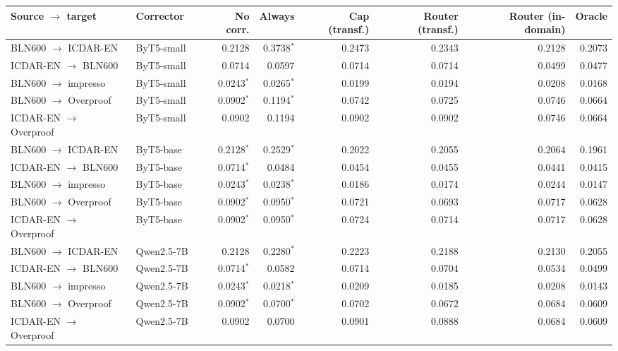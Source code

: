 \begin{tabular}{lllrrrrrr}
\toprule
Source $\rightarrow$ target & Corrector & & No corr. & Always & Cap (transf.) & Router (transf.) & Router (in-domain) & Oracle \\
\midrule
BLN600 $\rightarrow$ ICDAR-EN & ByT5-small & & 0.2128 & 0.3738$^{*}$ & 0.2473 & 0.2343 & 0.2128 & 0.2073 \\
ICDAR-EN $\rightarrow$ BLN600 & ByT5-small & & 0.0714 & 0.0597 & 0.0714 & 0.0714 & 0.0499 & 0.0477 \\
BLN600 $\rightarrow$ impresso & ByT5-small & & 0.0243$^{*}$ & 0.0265$^{*}$ & 0.0199 & 0.0194 & 0.0208 & 0.0168 \\
BLN600 $\rightarrow$ Overproof & ByT5-small & & 0.0902$^{*}$ & 0.1194$^{*}$ & 0.0742 & 0.0725 & 0.0746 & 0.0664 \\
ICDAR-EN $\rightarrow$ Overproof & ByT5-small & & 0.0902 & 0.1194 & 0.0902 & 0.0902 & 0.0746 & 0.0664 \\
BLN600 $\rightarrow$ ICDAR-EN & ByT5-base & & 0.2128$^{*}$ & 0.2529$^{*}$ & 0.2022 & 0.2055 & 0.2064 & 0.1961 \\
ICDAR-EN $\rightarrow$ BLN600 & ByT5-base & & 0.0714$^{*}$ & 0.0484 & 0.0454 & 0.0455 & 0.0441 & 0.0415 \\
BLN600 $\rightarrow$ impresso & ByT5-base & & 0.0243$^{*}$ & 0.0238$^{*}$ & 0.0186 & 0.0174 & 0.0244 & 0.0147 \\
BLN600 $\rightarrow$ Overproof & ByT5-base & & 0.0902$^{*}$ & 0.0950$^{*}$ & 0.0721 & 0.0693 & 0.0717 & 0.0628 \\
ICDAR-EN $\rightarrow$ Overproof & ByT5-base & & 0.0902$^{*}$ & 0.0950$^{*}$ & 0.0724 & 0.0714 & 0.0717 & 0.0628 \\
BLN600 $\rightarrow$ ICDAR-EN & Qwen2.5-7B & & 0.2128 & 0.2280$^{*}$ & 0.2223 & 0.2188 & 0.2130 & 0.2055 \\
ICDAR-EN $\rightarrow$ BLN600 & Qwen2.5-7B & & 0.0714$^{*}$ & 0.0582 & 0.0714 & 0.0704 & 0.0534 & 0.0499 \\
BLN600 $\rightarrow$ impresso & Qwen2.5-7B & & 0.0243$^{*}$ & 0.0218$^{*}$ & 0.0209 & 0.0185 & 0.0208 & 0.0143 \\
BLN600 $\rightarrow$ Overproof & Qwen2.5-7B & & 0.0902$^{*}$ & 0.0700$^{*}$ & 0.0702 & 0.0672 & 0.0684 & 0.0609 \\
ICDAR-EN $\rightarrow$ Overproof & Qwen2.5-7B & & 0.0902 & 0.0700 & 0.0901 & 0.0888 & 0.0684 & 0.0609 \\
\bottomrule
\end{tabular}
